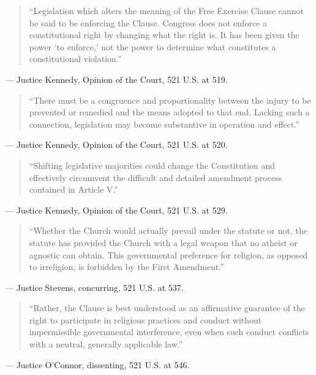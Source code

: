 \documentclass[12pt]{article}
\begin{document}
\begin{quote}
``Legislation which alters the meaning of the Free Exercise Clause cannot be said to be enforcing the Clause. Congress does not enforce a constitutional right by changing what the right is. It has been given the power `to enforce,' not the power to determine what constitutes a constitutional violation.''
\end{quote}
\noindent --- Justice Kennedy, Opinion of the Court, 521 U.S. at 519.

\begin{quote}
``There must be a congruence and proportionality between the injury to be prevented or remedied and the means adopted to that end. Lacking such a connection, legislation may become substantive in operation and effect.''
\end{quote}
\noindent --- Justice Kennedy, Opinion of the Court, 521 U.S. at 520.

\begin{quote}
``Shifting legislative majorities could change the Constitution and effectively circumvent the difficult and detailed amendment process contained in Article V.''
\end{quote}
\noindent --- Justice Kennedy, Opinion of the Court, 521 U.S. at 529.

\begin{quote}
``Whether the Church would actually prevail under the statute or not, the statute has provided the Church with a legal weapon that no atheist or agnostic can obtain. This governmental preference for religion, as opposed to irreligion, is forbidden by the First Amendment.''
\end{quote}
\noindent --- Justice Stevens, concurring, 521 U.S. at 537.

\begin{quote}
``Rather, the Clause is best understood as an affirmative guarantee of the right to participate in religious practices and conduct without impermissible governmental interference, even when such conduct conflicts with a neutral, generally applicable law.''
\end{quote}
\noindent --- Justice O'Connor, dissenting, 521 U.S. at 546.
\end{document}

